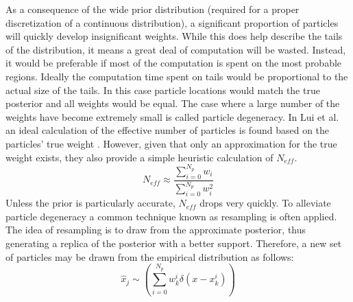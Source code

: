 As a consequence 
of the wide prior distribution (required for a proper discretization of a continuous
distribution), a significant proportion of particles will quickly
develop insignificant weights. 
While this does help
describe the tails of the distribution, it means a great deal of computation will be wasted.
Instead, it would be preferable if most of the computation is spent on the most probable regions.
Ideally the computation time spent on tails would be proportional to the actual size of the
tails. In this case particle locations would match the true posterior and all weights would
be equal.  The case where a large number of the weights have become extremely small
is called particle degeneracy. In  Lui et al. 
an ideal calculation of the effective number of particles is found based on the 
particles' true weight \cite{Liu1998b}. However, given that only an approximation 
for the true weight 
exists, they also provide a simple heuristic calculation of $N_{eff}$.
\begin{equation}
N_{eff} \approx \frac{\sum_{i=0}^{N_p} w_i}{\sum_{i=0}^{N_p} w_i^2}
\label{eq:neff}
\end{equation}
Unless the prior is particularly accurate,
$N_{eff}$ drops very quickly.  To alleviate particle degeneracy
a common technique known as resampling is often applied. The idea of resampling is to 
draw from the approximate posterior, thus generating a replica of the posterior with 
a better support. Therefore, a new set of particles may be drawn from the empirical
distribution as follows:
\begin{equation}
\hat{x}_j \sim \left(\sum_{i=0}^{N_p} w^i_k\delta(x - x^i_k)\right)
\end{equation}

